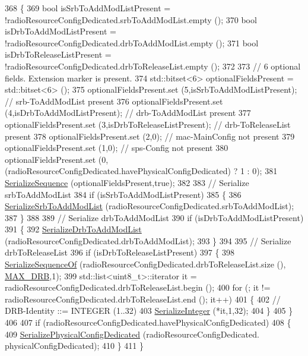 \begin{DoxyCode}
368 \{
369   \textcolor{keywordtype}{bool} isSrbToAddModListPresent = !radioResourceConfigDedicated.srbToAddModList.empty ();
370   \textcolor{keywordtype}{bool} isDrbToAddModListPresent = !radioResourceConfigDedicated.drbToAddModList.empty ();
371   \textcolor{keywordtype}{bool} isDrbToReleaseListPresent = !radioResourceConfigDedicated.drbToReleaseList.empty ();
372 
373   \textcolor{comment}{// 6 optional fields. Extension marker is present.}
374   std::bitset<6> optionalFieldsPresent = std::bitset<6> ();
375   optionalFieldsPresent.set (5,isSrbToAddModListPresent);  \textcolor{comment}{// srb-ToAddModList present}
376   optionalFieldsPresent.set (4,isDrbToAddModListPresent);  \textcolor{comment}{// drb-ToAddModList present}
377   optionalFieldsPresent.set (3,isDrbToReleaseListPresent);  \textcolor{comment}{// drb-ToReleaseList present}
378   optionalFieldsPresent.set (2,0);  \textcolor{comment}{// mac-MainConfig not present}
379   optionalFieldsPresent.set (1,0);  \textcolor{comment}{// sps-Config not present}
380   optionalFieldsPresent.set (0,(radioResourceConfigDedicated.havePhysicalConfigDedicated) ? 1 : 0);
381   \hyperlink{classns3_1_1Asn1Header_aa9744858380443ed95836fed08799aed}{SerializeSequence} (optionalFieldsPresent,\textcolor{keyword}{true});
382 
383   \textcolor{comment}{// Serialize srbToAddModList}
384   \textcolor{keywordflow}{if} (isSrbToAddModListPresent)
385     \{
386       \hyperlink{classns3_1_1RrcAsn1Header_ad0c889ae1863b620e86026db7d217c75}{SerializeSrbToAddModList} (radioResourceConfigDedicated.srbToAddModList);
387     \}
388 
389   \textcolor{comment}{// Serialize drbToAddModList}
390   \textcolor{keywordflow}{if} (isDrbToAddModListPresent)
391     \{
392       \hyperlink{classns3_1_1RrcAsn1Header_ae227535eb179f1fc87b500225a5893ef}{SerializeDrbToAddModList} (radioResourceConfigDedicated.drbToAddModList);
393     \}
394 
395   \textcolor{comment}{// Serialize drbToReleaseList}
396   \textcolor{keywordflow}{if} (isDrbToReleaseListPresent)
397     \{
398       \hyperlink{classns3_1_1Asn1Header_a066b6dd077bde6b0c243f3eda2621277}{SerializeSequenceOf} (radioResourceConfigDedicated.drbToReleaseList.size (),
      \hyperlink{lte-rrc-header_8cc_a3007772924a76edef0d1eb9c400abdac}{MAX\_DRB},1);
399       std::list<uint8\_t>::iterator it = radioResourceConfigDedicated.drbToReleaseList.begin ();
400       \textcolor{keywordflow}{for} (; it != radioResourceConfigDedicated.drbToReleaseList.end (); it++)
401         \{
402           \textcolor{comment}{// DRB-Identity ::= INTEGER (1..32)}
403           \hyperlink{classns3_1_1Asn1Header_ab1c3bd37730affa7473bc759d625c29a}{SerializeInteger} (*it,1,32);
404         \}
405     \}
406 
407   \textcolor{keywordflow}{if} (radioResourceConfigDedicated.havePhysicalConfigDedicated)
408     \{
409       \hyperlink{classns3_1_1RrcAsn1Header_a7543693686024fa6f694168cbee7110b}{SerializePhysicalConfigDedicated} (radioResourceConfigDedicated.
      physicalConfigDedicated);
410     \}
411 \}
\end{DoxyCode}


